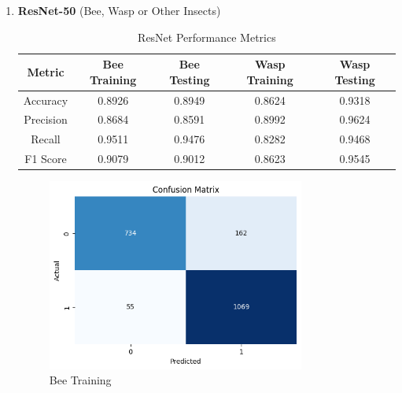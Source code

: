 \documentclass[12pt]{article}
\begin{document}
\begin{enumerate}
		\item \textbf{ResNet-50} (Bee, Wasp or Other Insects) \\
		\begin{table}[H]
			\centering
			\caption{ResNet Performance Metrics}
			\vspace{0.25 cm}
			\begin{tabular}{|c|c|c|c|c|}
				\hline
				\textbf{Metric} & \textbf{Bee Training} & \textbf{Bee Testing}  & \textbf{Wasp Training} & \textbf{Wasp Testing}\\
				\hline
				Accuracy & 0.8926  & 0.8949  & 0.8624  & 0.9318  \\ \hline
				Precision & 0.8684 & 0.8591  & 0.8992 & 0.9624  \\ \hline
				Recall & 0.9511 & 0.9476 & 0.8282 & 0.9468 \\ \hline
				F1 Score & 0.9079  & 0.9012 & 0.8623  & 0.9545 \\ \hline
			\end{tabular}
			\label{tab:RESNET_METRICS}
		\end{table}
		\begin{figure}[H]
			\vspace{0.5 cm}
			\centering
			\begin{minipage}{0.45\textwidth}
				\centering
				\includegraphics[width=0.8\textwidth]{Images/Confusion/res bees train.png} \\ \vspace{0.25 cm}
				Bee Training
			\end{minipage}
			\hfill
			\begin{minipage}{0.45\textwidth}    
				\centering

\end{minipage}
\end{figure}
\end{enumerate}
\end{document}
